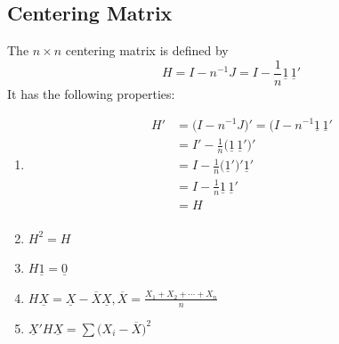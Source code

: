 \documentclass[11pt,a4paper]{article}
\theoremstyle{definition}
\begin{document}
\subsection{Centering Matrix}
The $n\times n$ centering matrix is defined by $$H = I - n^{-1}J = I - \frac{1}{n}\underline{1}\,\underline{1}'$$ It has the following properties:
\begin{enumerate}
\item \begin{align*}
H' & = \big(I - n^{-1}J\big)' = \big(I - n^{-1}\underline{1}\,\underline{1}'\\
& = I' - \frac{1}{n}\big(\underline{1}\,\underline{1}'\big)'\\
& = I - \frac{1}{n}\big(\underline{1}'\big)' \underline{1}'\\
& = I - \frac{1}{n}\underline{1}\,\underline{1}'\\
& = H\\
\end{align*}

\item $\displaystyle{H^2 = H}$

\item $\displaystyle{H\underline{1} = \underline{0}}$

\item $\displaystyle{H\underline{X}=\underline{X}-\overline{X}\underline{X}, \overline{X}=\frac{X_1 + X_2 + \cdots+ X_n}{n}}$

\item $\displaystyle{\underline{X}'H\underline{X} = \sum \big(X_i - \overline{X}\big)^2}$\\\\
\end{enumerate}
\end{document}

